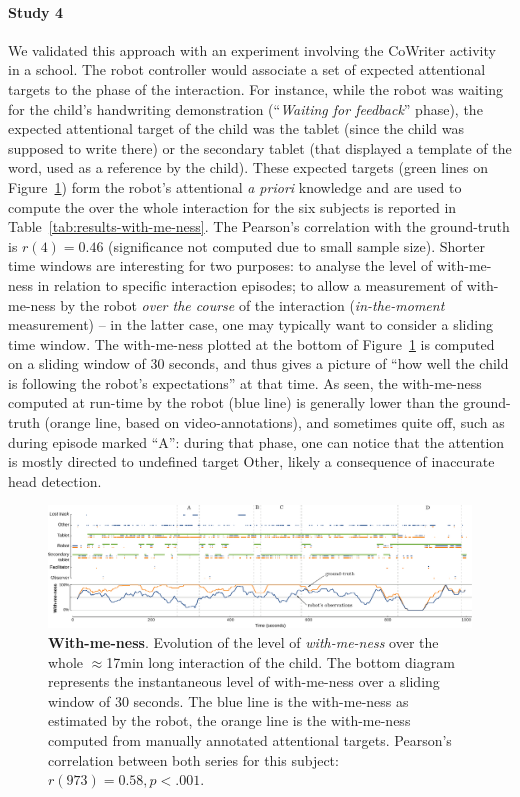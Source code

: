 \documentclass[10pt,a4paper]{article}
\begin{document}
\paragraph{Study 4}
We validated this approach with an experiment involving the CoWriter activity in a school.
The robot
controller would associate a set of expected attentional targets to the phase of
the interaction. For instance, while the robot was
waiting for the child's handwriting demonstration (``\textit{Waiting for
feedback}'' phase), the expected attentional target of the child was the tablet (since
the child was supposed to write there) or the secondary tablet (that displayed a
template of the word, used as a reference by the child). These expected targets
(green lines on Figure~\ref{fig:with-me-ness}) form the robot's attentional {\it
a priori} knowledge and are used to compute the over the whole interaction for the six subjects is reported in
Table~\ref{tab:results-with-me-ness}. The Pearson's correlation with the
ground-truth is $r(4)=0.46$ (significance not computed due to small sample
size). Shorter time windows are interesting for two purposes: to analyse the
level of with-me-ness in relation to specific interaction episodes; to allow a
measurement of with-me-ness by the robot \emph{over the course} of the
interaction (\emph{in-the-moment} measurement) -- in the latter case, one may
typically want to consider a sliding time window.
The with-me-ness plotted at the bottom of Figure~\ref{fig:with-me-ness} is computed on a sliding window of 30 seconds, and thus gives a picture of
``how well the child is following the robot's expectations'' at that time. As
seen, the with-me-ness computed at run-time by the robot (blue line) is
generally lower than the ground-truth (orange line, based on video-annotations),
and sometimes quite off, such as during episode marked ``A'': during that phase,
one can notice that the attention is mostly directed to undefined target {\sf
Other}, likely a consequence of inaccurate head detection.  

\begin{figure}
    \centering
    \includegraphics[width=\linewidth]{with-me-ness}
    \caption{\small \textbf{With-me-ness}. Evolution of the level of
        \emph{with-me-ness} over the whole $\approx$17min long interaction of
        the child. The bottom
        diagram represents the instantaneous level of with-me-ness over a
        sliding window of 30 seconds. The blue line is the with-me-ness as estimated
        by the robot, the orange line is the with-me-ness computed from manually
        annotated attentional targets.  Pearson's correlation between both
        series for this subject: $r(973)=0.58, p < .001$.}

    \label{fig:with-me-ness}
\end{figure}
\end{document}

